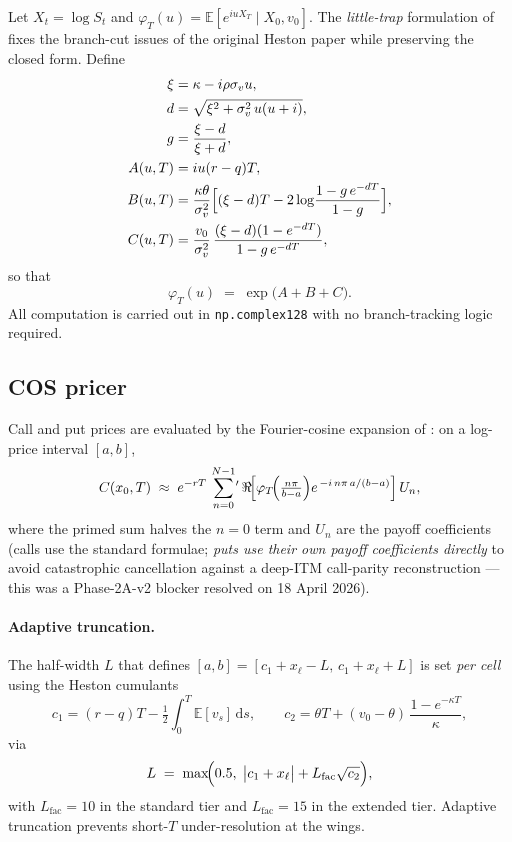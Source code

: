 \documentclass[11pt,a4paper]{article}
\newcommand{\E}{\mathbb{E}}
\newcommand{\phinorm}{\varphi}
\begin{document}
Let $X_t = \log S_t$ and $\phinorm_T(u) = \E[e^{i u X_T}\mid X_0,v_0]$.
The \emph{little-trap} formulation of \cite{albrecher2007little} fixes
the branch-cut issues of the original Heston paper while preserving the
closed form. Define
\begin{align*}
  \xi   &= \kappa - i\rho\sigma_v u, \\
  d     &= \sqrt{\xi^2 + \sigma_v^2\,u(u + i)}, \\
  g     &= \frac{\xi - d}{\xi + d}, \\
  A(u,T)&= i u (r-q) T, \\
  B(u,T)&= \frac{\kappa\theta}{\sigma_v^2}\Bigl[(\xi - d)T - 2\log\!\frac{1 - g\,e^{-dT}}{1 - g}\Bigr], \\
  C(u,T)&= \frac{v_0}{\sigma_v^2}\,\frac{(\xi - d)(1 - e^{-dT})}{1 - g\,e^{-dT}},
\end{align*}
so that
\[
  \phinorm_T(u) \;=\; \exp\!\bigl(A + B + C\bigr).
\]
All computation is carried out in \texttt{np.complex128} with no
branch-tracking logic required.

\subsection{COS pricer}
\label{sec:cos}

Call and put prices are evaluated by the Fourier-cosine expansion of
\cite{fangoosterlee2008}: on a log-price interval $[a,b]$,
\[
  C(x_0,T)
  \;\approx\;
  e^{-rT}\,
  \sum_{n=0}^{N-1}\!{}^{\prime}\,
  \Re\!\Bigl[\phinorm_T\!\Bigl(\tfrac{n\pi}{b-a}\Bigr)
    e^{\,-i\,n\pi\,a/(b-a)}\Bigr]\,U_n,
\]
where the primed sum halves the $n=0$ term and $U_n$ are the
payoff coefficients (calls use the standard formulae;
\emph{puts use their own payoff coefficients directly} to avoid
catastrophic cancellation against a deep-ITM call-parity reconstruction
--- this was a Phase-2A-v2 blocker resolved on 18 April 2026).

\paragraph{Adaptive truncation.}
The half-width $L$ that defines $[a,b] = [c_1 + x_\ell - L,\,c_1 + x_\ell + L]$
is set \emph{per cell} using the Heston cumulants
\[
  c_1 = (r-q)T - \tfrac{1}{2}\!\int_0^T\!\E[v_s]\,\mathrm{d}s,
  \qquad
  c_2 = \theta T + (v_0 - \theta)\,\frac{1 - e^{-\kappa T}}{\kappa},
\]
via
\[
  L \;=\; \max\!\Bigl(0.5,\;\bigl|c_1 + x_\ell\bigr| + L_{\text{fac}}\sqrt{c_2}\Bigr),
\]
with $L_{\text{fac}}=10$ in the standard tier and $L_{\text{fac}}=15$ in
the extended tier. Adaptive truncation prevents short-$T$
under-resolution at the wings.
\end{document}
